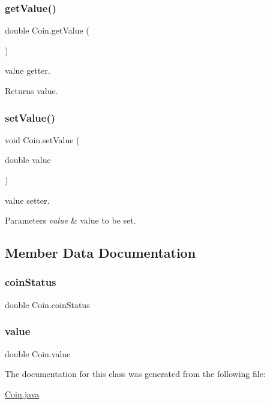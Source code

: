 \subsubsection{\texorpdfstring{get\+Value()}{getValue()}}
{\footnotesize\ttfamily double Coin.\+get\+Value (\begin{DoxyParamCaption}{ }\end{DoxyParamCaption})\hspace{0.3cm}{\ttfamily [inline]}}

value getter. \begin{DoxyReturn}{Returns}
value. 
\end{DoxyReturn}
\mbox{\label{class_coin_a4f3abfae192ec4fdf21389f41f799c5d}} 
\subsubsection{\texorpdfstring{set\+Value()}{setValue()}}
{\footnotesize\ttfamily void Coin.\+set\+Value (\begin{DoxyParamCaption}\item[{double}]{value }\end{DoxyParamCaption})\hspace{0.3cm}{\ttfamily [inline]}}

value setter. 
\begin{DoxyParams}{Parameters}
{\em value} & value to be set. \\
\hline
\end{DoxyParams}


\subsection{Member Data Documentation}
\mbox{\label{class_coin_abf41bb0f883b43451460f3021ec6eed9}} 
\subsubsection{\texorpdfstring{coin\+Status}{coinStatus}}
{\footnotesize\ttfamily double Coin.\+coin\+Status\hspace{0.3cm}{\ttfamily [private]}}

\mbox{\label{class_coin_a1f18db679edab240c514b9a4dc47ec97}} 
\subsubsection{\texorpdfstring{value}{value}}
{\footnotesize\ttfamily double Coin.\+value\hspace{0.3cm}{\ttfamily [private]}}



The documentation for this class was generated from the following file\+:\begin{DoxyCompactItemize}
\item 
\mbox{\hyperlink{_coin_8java}{Coin.\+java}}\end{DoxyCompactItemize}
